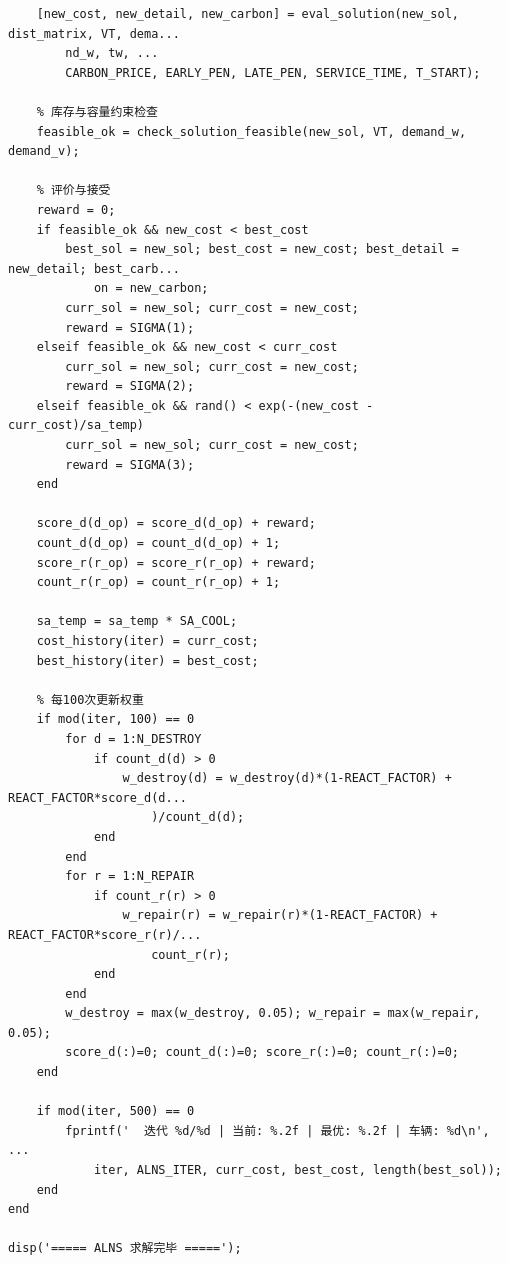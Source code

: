 {\begin{verbatim}
    [new_cost, new_detail, new_carbon] = eval_solution(new_sol, dist_matrix, VT, dema...
        nd_w, tw, ...
        CARBON_PRICE, EARLY_PEN, LATE_PEN, SERVICE_TIME, T_START);

    % 库存与容量约束检查
    feasible_ok = check_solution_feasible(new_sol, VT, demand_w, demand_v);

    % 评价与接受
    reward = 0;
    if feasible_ok && new_cost < best_cost
        best_sol = new_sol; best_cost = new_cost; best_detail = new_detail; best_carb...
            on = new_carbon;
        curr_sol = new_sol; curr_cost = new_cost;
        reward = SIGMA(1);
    elseif feasible_ok && new_cost < curr_cost
        curr_sol = new_sol; curr_cost = new_cost;
        reward = SIGMA(2);
    elseif feasible_ok && rand() < exp(-(new_cost - curr_cost)/sa_temp)
        curr_sol = new_sol; curr_cost = new_cost;
        reward = SIGMA(3);
    end

    score_d(d_op) = score_d(d_op) + reward;
    count_d(d_op) = count_d(d_op) + 1;
    score_r(r_op) = score_r(r_op) + reward;
    count_r(r_op) = count_r(r_op) + 1;

    sa_temp = sa_temp * SA_COOL;
    cost_history(iter) = curr_cost;
    best_history(iter) = best_cost;

    % 每100次更新权重
    if mod(iter, 100) == 0
        for d = 1:N_DESTROY
            if count_d(d) > 0
                w_destroy(d) = w_destroy(d)*(1-REACT_FACTOR) + REACT_FACTOR*score_d(d...
                    )/count_d(d);
            end
        end
        for r = 1:N_REPAIR
            if count_r(r) > 0
                w_repair(r) = w_repair(r)*(1-REACT_FACTOR) + REACT_FACTOR*score_r(r)/...
                    count_r(r);
            end
        end
        w_destroy = max(w_destroy, 0.05); w_repair = max(w_repair, 0.05);
        score_d(:)=0; count_d(:)=0; score_r(:)=0; count_r(:)=0;
    end

    if mod(iter, 500) == 0
        fprintf('  迭代 %d/%d | 当前: %.2f | 最优: %.2f | 车辆: %d\n', ...
            iter, ALNS_ITER, curr_cost, best_cost, length(best_sol));
    end
end

disp('===== ALNS 求解完毕 =====');

\end{verbatim}
}